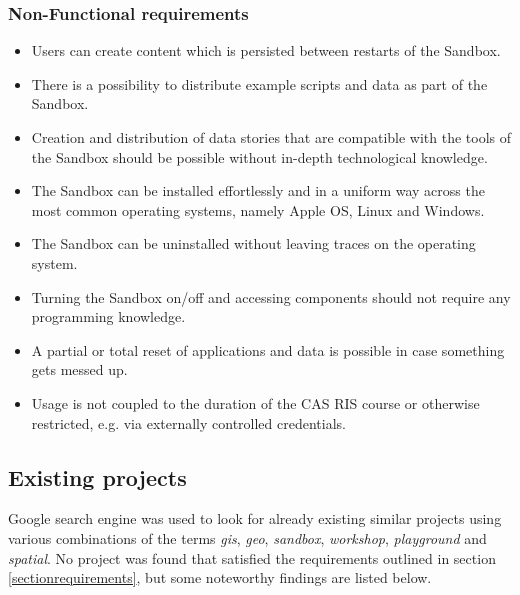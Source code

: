 \documentclass[11pt, a4paper, oneside, parskip=full-]{scrartcl}
\begin{document}
\subsubsection{Non-Functional requirements}
\begin{itemize}
  \item Users can create content which is persisted between restarts of the
  Sandbox.
  \item There is a possibility to distribute example scripts and data as part of
  the Sandbox.
  \item Creation and distribution of data stories that are compatible with the
  tools of the Sandbox should be possible without in-depth technological
  knowledge.
  \item The Sandbox can be installed effortlessly and in a uniform way across
  the most common operating systems, namely Apple OS, Linux and Windows.
  \item The Sandbox can be uninstalled without leaving traces on the operating
  system.
  \item Turning the Sandbox on/off and accessing components should not require
  any programming knowledge.
  \item A partial or total reset of applications and data is possible in case
  something gets messed up.
  \item Usage is not coupled to the duration of the CAS RIS course or otherwise
  restricted, e.g. via externally controlled credentials.
\end{itemize}

\subsection{Existing projects}
Google search engine was used to look for already existing similar projects
using various combinations of the terms \emph{gis}, \emph{geo}, \emph{sandbox},
\emph{workshop}, \emph{playground} and \emph{spatial}. No project was found that
satisfied the requirements outlined in section \ref{sectionrequirements}, but
some noteworthy findings are listed below.
\end{document}
